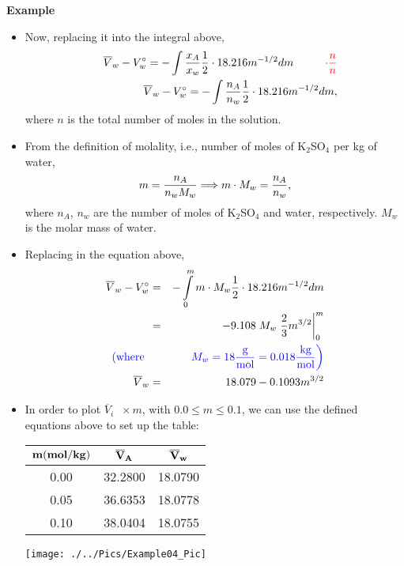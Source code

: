 \begin{MyExample}{\begin{center}{\bf Example}\end{center}}
\begin{itemize}
  \item Now, replacing it into the integral above,
       \begin{eqnarray}
          && \overline{V}_{w} - V_{w}^{\circ} = -\int\displaystyle\frac{x_{A}}{x_{w}} \displaystyle\frac{1}{2}\cdot 18.216 m^{-1/2} dm \hspace{1cm} \textcolor{red}{\cdot\displaystyle\frac{n}{n}} \nonumber \\
          && \overline{V}_{w} - V_{w}^{\circ} = -\int\displaystyle\frac{n_{A}}{n_{w}} \displaystyle\frac{1}{2}\cdot 18.216 m^{-1/2} dm, \nonumber
       \end{eqnarray}
       where $n$ is the total number of moles in the solution.

  \item From the definition of molality, i.e., number of moles of K$_{2}$SO$_{4}$ per kg of water,
       \begin{displaymath}
           m = \displaystyle\frac{n_{A}}{n_{w}M_{w}} \Longrightarrow m\cdot M_{w} = \displaystyle\frac{n_{A}}{n_{w}},
       \end{displaymath}
       where $n_{A}$, $n_{w}$ are the number of moles of K$_{2}$SO$_{4}$ and water, respectively. $M_{w}$ is the molar mass of water.

  \item Replacing in the equation above, 
      \begin{eqnarray}
         \overline{V}_{w} - V_{w}^{\circ} &=& -\int\limits_{0}^{m} m\cdot M_{w} \displaystyle\frac{1}{2}\cdot 18.216 m^{-1/2} dm \nonumber \\
                                       &=& -9.108\; M_{w} \left. \displaystyle\frac{2}{3} m^{3/2}\right|_{0}^{m} \nonumber \\
         \textcolor{blue}{\left(\text{where }\right.}&& \textcolor{blue}{\left. M_{w} = 18 \displaystyle\frac{\text{g}}{\text{mol}} = 0.018 \displaystyle\frac{\text{kg}}{\text{mol}}\right)} \nonumber \\
         \overline{V}_{w} &=&  18.079 - 0.1093 m^{3/2} \nonumber 
      \end{eqnarray}

  \item In order to plot $\overline{V}_{i}\;\;\times m$, with $0.0\leq m\leq 0.1$, we can use the defined equations above to set  up the table:  
        \begin{center}
          \begin{tabular}{|c | c c |}
            \hline
            ${\bf m (mol/kg)}$ & ${\bf \overline{V}_{A}}$ & ${\bf \overline{V}_{w}}$ \\
            \hline
              0.00  & 32.2800 &  18.0790 \\
              0.05  & 36.6353 &  18.0778 \\
              0.10  & 38.0404 &  18.0755 \\
             \hline
          \end{tabular}
        \end{center}
          \begin{center}
              \texttt{[image: ./../Pics/Example04\_Pic]}
          \end{center}
\end{itemize}


\end{MyExample}
